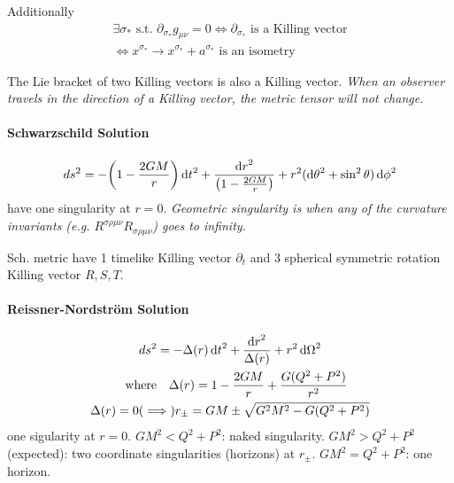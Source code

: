 \documentclass[main]{subfiles}
\begin{document}
\begin{multicols}{2}
Additionally
\begin{gather}
    \exists {\sigma_*} \text{ s.t. } \partial_{\sigma_*}g_{\mu\nu} = 0 \Leftrightarrow \partial_{\sigma_*} \text{ is a Killing vector}
    \\
    \Leftrightarrow x^{\sigma_*}\rightarrow x^{\sigma_*} + a^{\sigma_*} \text{ is an isometry}
\end{gather}

The Lie bracket of two Killing vectors is also a Killing vector. \textit{When an observer travels in the direction of a Killing vector, the metric tensor will not change.}



\end{multicols}

\begin{multicols}{2}
\paragraph{Schwarzschild Solution}
    \begin{align}
        ds^2 = - \qty(1 - \frac{2GM}{r}) \dd{t}^2 + \frac{\dd{r}^2}{\qty(1 - \frac{2GM}{r})} + r^2 (\dd{\theta}^2 + \sin^2\theta) \dd{\phi}^2 \notag
    \end{align}
    have one singularity at $r=0$. \textit{Geometric singularity is when any of the curvature invariants (e.g. $R^{\sigma\rho\mu\nu}R_{\sigma\rho\mu\nu}$) goes to infinity.}

    Sch. metric have 1 timelike Killing vector $\partial_t$ and 3 spherical symmetric rotation Killing vector $R, S, T$. 

    \paragraph{Reissner-Nordström Solution}
    \begin{gather}
        ds^2 = -\Delta(r) \dd{t}^2 + \frac{\dd{r}^2}{\Delta(r)} + r^2\dd{\Omega}^2
        \\
        \qq{where}\Delta(r) = 1 - \frac{2GM}{r} + \frac{G(Q^2 + P^2)}{r^2}
        \\
        \Delta(r) = 0 (\implies) r_{\pm} = GM \pm \sqrt{G^2M^2 - G(Q^2+P^2)}
    \end{gather}
    one sigularity at $r=0$. $GM^2 < Q^2 + P^2$: naked singularity. $GM^2 > Q^2 + P^2$ (expected): two coordinate singularities (horizons) at $r_{\pm}$. $GM^2 = Q^2 + P^2$: one horizon.
    
    
\end{multicols}
\end{document}
